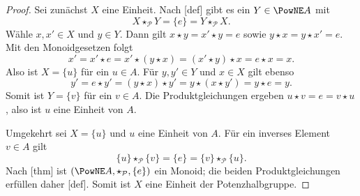\documentclass[main.tex]{subfiles}
\begin{document}
\begin{proof}
Sei zunächst \(X\) eine Einheit.  Nach
[def] gibt es ein \(Y\in\PowNE A\) mit
\[
  X\star_{\mathcal P}Y=\{e\}
  =Y\star_{\mathcal P}X.
\]
Wähle \(x,x'\in X\) und \(y\in Y\).  Dann gilt
\(x\star y=x'\star y=e\) sowie
\(y\star x=y\star x'=e\).  Mit den Monoidgesetzen folgt
\[
  x'=x'\star e
     =x'\star(y\star x)
     =(x'\star y)\star x
     =e\star x=x.
\]
Also ist \(X=\{u\}\) für ein \(u\in A\).  Für \(y,y'\in Y\) und
\(x\in X\) gilt ebenso
\[
  y'=e\star y'
     =(y\star x)\star y'
     =y\star(x\star y')
     =y\star e=y.
\]
Somit ist \(Y=\{v\}\) für ein \(v\in A\).  Die Produktgleichungen ergeben
\(u\star v=e=v\star u\), also ist \(u\) eine Einheit von \(A\).

Umgekehrt sei \(X=\{u\}\) und \(u\) eine Einheit von \(A\).  Für ein
inverses Element \(v\in A\) gilt
\[
  \{u\}\star_{\mathcal P}\{v\}=\{e\}
  =\{v\}\star_{\mathcal P}\{u\}.
\]
Nach [thm] ist
\((\PowNE A,\star_{\mathcal P},\{e\})\) ein Monoid; die beiden
Produktgleichungen erfüllen daher
[def].  Somit ist \(X\) eine Einheit der
Potenzhalbgruppe.
\end{proof}

\begin{tabproof}
\end{tabproof}
\end{document}
